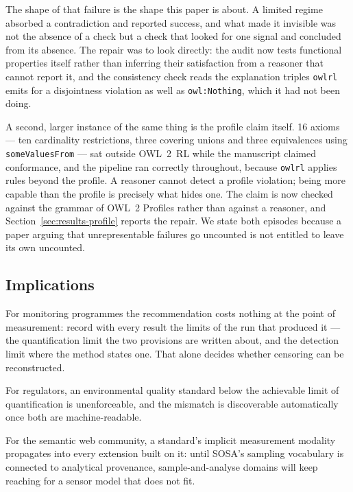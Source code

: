 The shape of that failure is the shape this paper is about. A limited regime
absorbed a contradiction and reported success, and what made it invisible was
not the absence of a check but a check that looked for one signal and concluded
from its absence. The repair was to look directly: the audit now tests
functional properties itself rather than inferring their satisfaction from a
reasoner that cannot report it, and the consistency check reads the explanation
triples \texttt{owlrl} emits for a disjointness violation as well as
\texttt{owl:Nothing}, which it had not been doing.

A second, larger instance of the same thing is the profile claim itself.
\num{16} axioms --- ten cardinality restrictions, three covering unions and
three equivalences using \texttt{someValuesFrom} --- sat outside OWL~2~RL while
the manuscript claimed conformance, and the pipeline ran correctly throughout,
because \texttt{owlrl} applies rules beyond the profile. A reasoner cannot
detect a profile violation; being more capable than the profile is precisely
what hides one. The claim is now checked against the grammar of OWL~2 Profiles
rather than against a reasoner, and
Section~\ref{sec:results-profile} reports the repair. We state both episodes
because a paper arguing that unrepresentable failures go uncounted is not
entitled to leave its own uncounted.

\subsection{Implications}
For monitoring programmes the recommendation costs nothing at the point of
measurement: record with every result the limits of the run that produced it ---
the quantification limit the two provisions are written about, and the detection
limit where the method states one. That alone decides whether censoring can be
reconstructed.

For regulators, an environmental quality standard below the achievable limit of
quantification is unenforceable, and the mismatch is discoverable automatically
once both are machine-readable.

For the semantic web community, a standard's implicit measurement modality
propagates into every extension built on it: until SOSA's sampling vocabulary
is connected to analytical provenance, sample-and-analyse domains will keep
reaching for a sensor model that does not fit.
